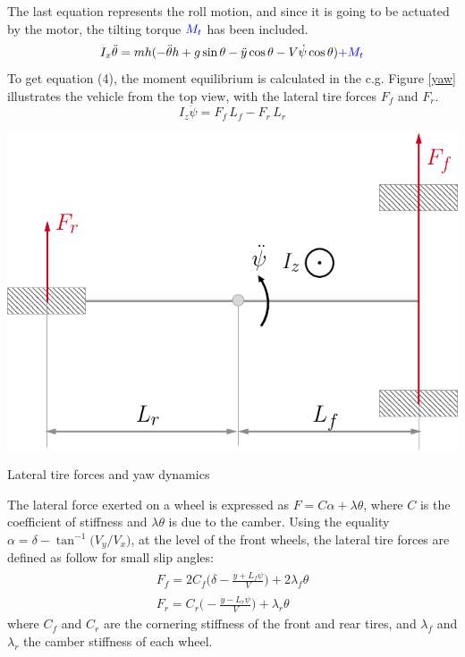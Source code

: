 The last equation represents the roll motion, and since it is going to be actuated by the motor, the tilting torque $\textcolor{blue}{M_{t}}$ has been included.
\[I_{x} \ddot{\theta}=mh(-\ddot{\theta}h + g \sin \theta -\ddot{y}\cos \theta-V \dot{\psi}\cos \theta) \textcolor{blue}{+M_{t}}\]
To get equation (4), the moment equilibrium is calculated in the c.g. Figure \ref{yaw} illustrates the vehicle from the top view, with the lateral tire forces $F_{f}$ and $F_{r}$.
\begin{equation}
I_{z} \ddot{\psi}=F_{f}\,L_{f} - F_{r}\,L_{r}
\end{equation}
\begin{marginfigure}[-5cm]
	\includegraphics[width=1.2\linewidth]{figs/02/top}
	\caption{Lateral tire forces and yaw dynamics}
	\label{yaw}
\end{marginfigure}
The lateral force exerted on a wheel is expressed as $F=C\alpha + \lambda\theta$, where $C$ is the coefficient of stiffness and $\lambda\theta$ is due to the camber. Using the equality $\alpha=\delta-\tan^{-1}\Big(V_{y}/V_{x}\Big)$, at the level of the front wheels, the lateral tire forces are defined as follow for small slip angles:
\begin{eqnarray}
F_{f}=2 C_{f}\Big(\delta - \frac{\dot{y}+L_{f} \dot{\psi}}{V} \Big) + 2 \lambda_{f} \theta \\
F_{r}=C_{r}\Big(- \frac{\dot{y}-L_{r} \dot{\psi}}{V} \Big) +\lambda_{r} \theta
\end{eqnarray}
where $C_{f}$ and $C_{r}$ are the cornering stiffness of the front and rear tires, and $\lambda_{f}$ and $\lambda_{r}$ the camber stiffness of each wheel. 

